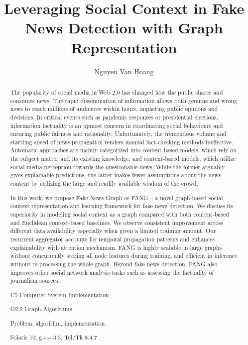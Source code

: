 \documentclass[fyp]{socreport}
\theoremstyle{definition}
\theoremstyle{hypothesis}
\begin{document}
\title{Leveraging Social Context in Fake News Detection with Graph Representation}
\author{Nguyen Van Hoang}
\maketitle
\begin{abstract}
The popularity of social media in Web 2.0 has changed how the public shares and consumes news. The rapid dissemination of information allows both genuine and wrong news to reach millions of audiences within hours, impacting public opinions and decisions. In critical events such as pandemic responses or presidential elections, information factuality is an upmost concern in coordinating social behaviours and ensuring public fairness and rationality. Unfortunately, the tremendous volume and startling speed of news propagation renders manual fact-checking methods ineffective. Automatic approaches are mainly categorized into content-based models, which rely on the subject matter and its existing knowledge, and context-based models, which utilize social media perception towards the questionable news. While the former arguably gives explainable predictions, the latter makes fewer assumptions about the news content by utilizing the large and readily available wisdom of the crowd.

In this work, we propose Fake News Graph or FANG -- a novel graph-based social context representation and learning framework for fake news detection. We discuss its superiority in modeling social context as a graph compared with both content-based and Euclidean context-based baselines. We observe consistent improvement across different data availability especially when given a limited training amount. Our recurrent aggregator accounts for temporal propagation patterns and enhances explainability with attention mechanism. FANG is highly scalable in large graphs without concurrently storing all node features during training, and efficient in inference without re-processing the whole graph. Beyond fake news detection, FANG also improves other social network analysis tasks such as assessing the factuality of journalism sources. 


\begin{descriptors}
    \item C5 Computer System Implementation
	\item G2.2 Graph Algorithms
\end{descriptors}
\begin{keywords}
	Problem, algorithm, implementation
\end{keywords}
\begin{implement}
	Solaris 10, g++ 3.3, Tcl/Tk 8.4.7
\end{implement}

\end{abstract}
\end{document}

